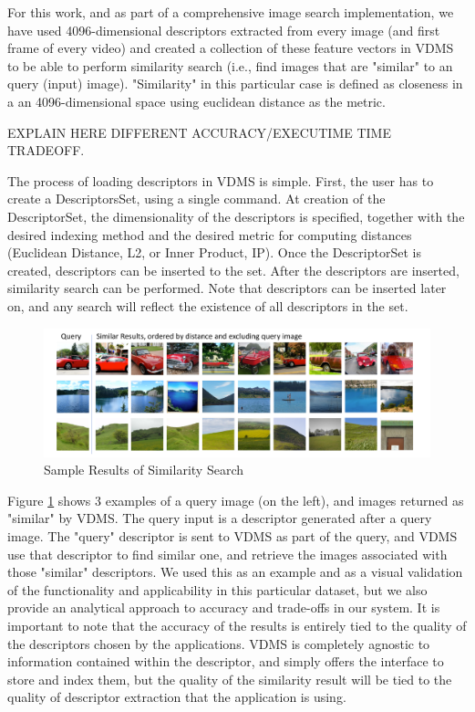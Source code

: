 For this work, and as part of a comprehensive image search implementation,
we have used 4096-dimensional descriptors extracted from every image
(and first frame of every video) and created a collection of these feature
vectors in VDMS to be able to perform similarity search (i.e., find
images that are "similar" to an query (input) image).
"Similarity" in this particular case is defined as closeness
in a an 4096-dimensional space using euclidean distance as the metric.

EXPLAIN HERE DIFFERENT ACCURACY/EXECUTIME TIME TRADEOFF.

The process of loading descriptors in VDMS is simple.
First, the user has to create a DescriptorsSet, using a single command.
At creation of the DescriptorSet, the dimensionality of the descriptors
is specified, together with the desired indexing method and the desired metric
for computing distances (Euclidean Distance, L2, or Inner Product, IP).
Once the DescriptorSet is created, descriptors can be inserted to the set.
After the descriptors are inserted, similarity search can be performed.
Note that descriptors can be inserted later on, and any search will reflect
the existence of all descriptors in the set.

\begin{figure}[]
\centering
\includegraphics[width=\textwidth]{figures/feature_img_results}
\caption{Sample Results of Similarity Search}
\label{fig:similarity}
\end{figure}

Figure \ref{fig:similarity} shows 3 examples of a query image (on the left),
and images returned as "similar" by VDMS.
The query input is a descriptor generated after a query image. The "query"
descriptor is sent to VDMS as part of the query, and VDMS use that descriptor
to find similar one, and retrieve the images associated with those "similar"
descriptors. We used this as an example and as a visual validation of the
functionality and applicability in this particular dataset, but we also
provide an analytical approach to accuracy and trade-offs in our system.
It is important to note that the accuracy of the results is entirely tied
to the quality of the descriptors chosen by the applications.
VDMS is completely agnostic to information contained within the descriptor,
and simply offers the interface to store and index them, but the quality
of the similarity result will be tied to the quality of descriptor extraction
that the application is using.


